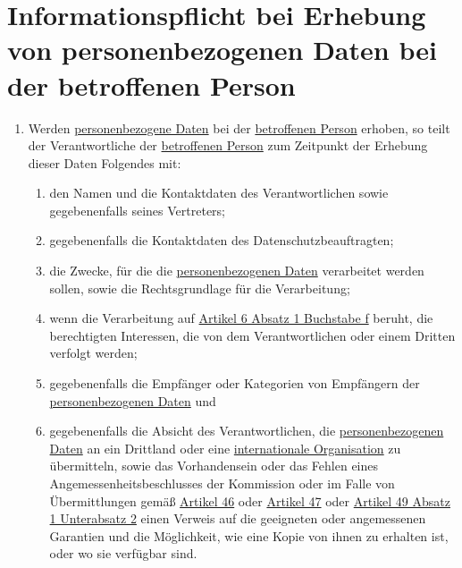 \chapter{Informationspflicht bei Erhebung von personenbezogenen Daten bei der betroffenen Person}
\label{ch:13}


\begin{enumerate}

  \item Werden \hyperref[itm:04-1]{personenbezogene Daten} bei der \hyperref[itm:04-1]{betroffenen Person} erhoben, so teilt der Verantwortliche der \hyperref[itm:04-1]{betroffenen
   Person} zum Zeitpunkt der Erhebung dieser Daten Folgendes mit:
  \label{itm:13-1}

  \begin{enumerate}
  
    \item den Namen und die Kontaktdaten des Verantwortlichen sowie gegebenenfalls seines Vertreters;
    \label{itm:13-1a}

    \item gegebenenfalls die Kontaktdaten des Datenschutzbeauftragten;
    \label{itm:13-1b}

    \item die Zwecke, für die die \hyperref[itm:04-1]{personenbezogenen Daten} verarbeitet werden sollen, sowie die Rechtsgrundlage für die
     Verarbeitung;
    \label{itm:13-1c}

    \item wenn die Verarbeitung auf \hyperref[itm:06-1f]{Artikel 6 Absatz 1 Buchstabe f} beruht, die berechtigten
     Interessen, die von dem Verantwortlichen oder einem Dritten verfolgt werden;
    \label{itm:13-1d}

    \item gegebenenfalls die Empfänger oder Kategorien von Empfängern der \hyperref[itm:04-1]{personenbezogenen Daten} und
    \label{itm:13-1e}

    \item gegebenenfalls die Absicht des Verantwortlichen, die \hyperref[itm:04-1]{personenbezogenen Daten} an ein Drittland oder eine
     \hyperref[itm:04-29]{internationale Organisation} zu übermitteln, sowie das Vorhandensein oder das Fehlen eines
     Angemessenheitsbeschlusses der Kommission oder im Falle von Übermittlungen gemäß \hyperref[ch:46]{Artikel 46} oder
     \hyperref[ch:47]{Artikel 47} oder \hyperref[itm:49-1-2]{Artikel 49 Absatz 1 Unterabsatz 2} einen Verweis auf die
      geeigneten oder angemessenen Garantien und die Möglichkeit, wie eine Kopie von ihnen zu erhalten ist, oder wo sie
      verfügbar sind.
    \label{itm:13-1f}


\end{enumerate}
\end{enumerate}
